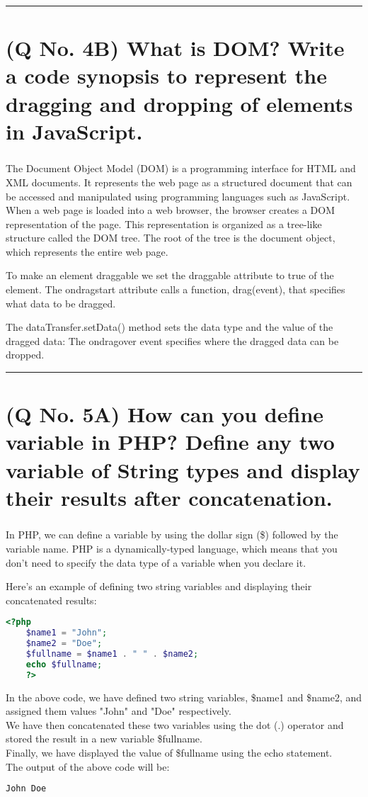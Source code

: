 \documentclass[11pt]{article}
\begin{document}
\noindent\rule{\linewidth}{0.4pt}
\section{(Q No. 4B) What is DOM? Write a code synopsis to represent the dragging and dropping of elements in JavaScript.}
\subparagraph{}
The Document Object Model (DOM) is a programming interface for HTML and XML documents. It represents the web page as a structured document that can be accessed and manipulated using programming languages such as JavaScript.
When a web page is loaded into a web browser, the browser creates a DOM representation of the page. This representation is organized as a tree-like structure called the DOM tree. The root of the tree is the document object, which represents the entire web page.


To make an element draggable we set the draggable attribute to true of the element.
The ondragstart attribute calls a function, drag(event), that specifies what data to be dragged.

The dataTransfer.setData() method sets the data type and the value of the dragged data:
The ondragover event specifies where the dragged data can be dropped.


\noindent\rule{\linewidth}{0.4pt}
\section{(Q No. 5A) How can you define variable in PHP? Define any two variable of String types and display their results after concatenation.}
\subparagraph{}
In PHP, we can define a variable by using the dollar sign (\$) followed by the variable name. PHP is a dynamically-typed language, which means that you don't need to specify the data type of a variable when you declare it.

Here's an example of defining two string variables and displaying their concatenated results:

\begin{lstlisting}[language=php]
    <?php
    $name1 = "John";
    $name2 = "Doe";
    $fullname = $name1 . " " . $name2;
    echo $fullname;
    ?>
\end{lstlisting}
In the above code, we have defined two string variables, \$name1 and \$name2, and assigned them values "John" and "Doe" respectively. \\
We have then concatenated these two variables using the dot (.) operator and stored the result in a new variable \$fullname. \\
Finally, we have displayed the value of \$fullname using the echo statement.\\
The output of the above code will be:
\begin{lstlisting}[language=php]
    John Doe
\end{lstlisting}
\end{document}

